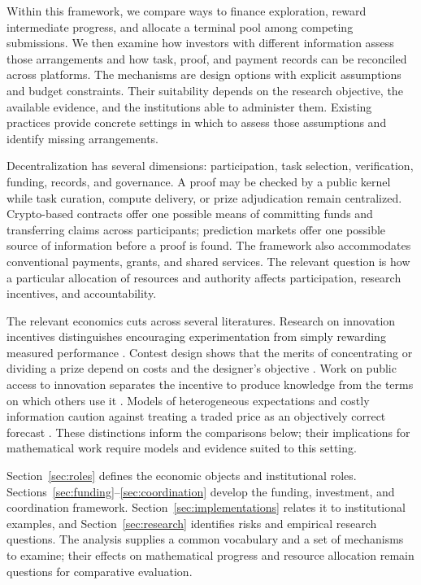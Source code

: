 \documentclass[11pt,a4paper]{article}
\begin{document}
Within this framework, we compare ways to finance exploration, reward intermediate progress, and allocate a terminal pool among competing submissions. We then examine how investors with different information assess those arrangements and how task, proof, and payment records can be reconciled across platforms. The mechanisms are design options with explicit assumptions and budget constraints. Their suitability depends on the research objective, the available evidence, and the institutions able to administer them. Existing practices provide concrete settings in which to assess those assumptions and identify missing arrangements.

Decentralization has several dimensions: participation, task selection, verification, funding, records, and governance. A proof may be checked by a public kernel while task curation, compute delivery, or prize adjudication remain centralized. Crypto-based contracts offer one possible means of committing funds and transferring claims across participants; prediction markets offer one possible source of information before a proof is found. The framework also accommodates conventional payments, grants, and shared services. The relevant question is how a particular allocation of resources and authority affects participation, research incentives, and accountability.

The relevant economics cuts across several literatures. Research on innovation incentives distinguishes encouraging experimentation from simply rewarding measured performance \citep{manso}. Contest design shows that the merits of concentrating or dividing a prize depend on costs and the designer's objective \citep{moldovanu}. Work on public access to innovation separates the incentive to produce knowledge from the terms on which others use it \citep{kremer}. Models of heterogeneous expectations and costly information caution against treating a traded price as an objectively correct forecast \citep{harrison,grossman}. These distinctions inform the comparisons below; their implications for mathematical work require models and evidence suited to this setting.

Section~\ref{sec:roles} defines the economic objects and institutional roles. Sections~\ref{sec:funding}--\ref{sec:coordination} develop the funding, investment, and coordination framework. Section~\ref{sec:implementations} relates it to institutional examples, and Section~\ref{sec:research} identifies risks and empirical research questions. The analysis supplies a common vocabulary and a set of mechanisms to examine; their effects on mathematical progress and resource allocation remain questions for comparative evaluation.
\end{document}
